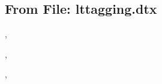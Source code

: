 \documentclass{l3in2edoc}
\begin{document}
\leavevmode


\subsection{From File: lttagging.dtx}


\begin{function}[]
  {
    \SuspendTagging,
    \ResumeTagging
  }
  \begin{syntax}
      
  \end{syntax}

\end{function}


\begin{function}[]
  {
    \NewTaggingSocket
  }

\end{function}



\begin{function}[]
  {
    \NewTaggingSocketPlug
  }

\end{function}


\begin{function}[]
  {
    \AssignTaggingSocketPlug
  }

\end{function}


\begin{function}[]
  {
    \UseTaggingSocket
  }

\end{function}


\begin{function}[]
  {
    \UseExpandableTaggingSocket
  }

\end{function}


\begin{function}[]
  {
    \MathCollectFalse,
    \MathCollectTrue
  }

\end{function}





\begin{function}[user]
  {
    \MathMLintent,
    \MathMLarg
  }
  \begin{syntax}
  \end{syntax}

\end{function}
\end{document}
